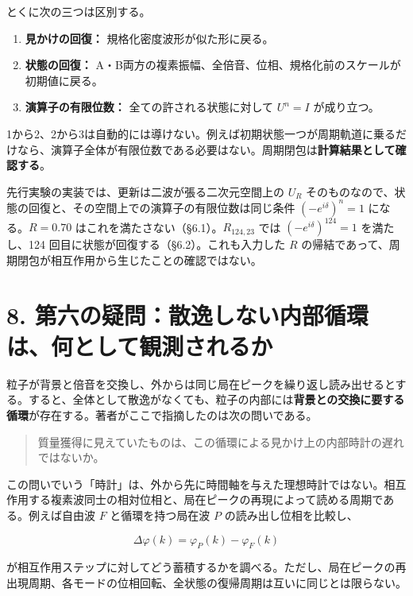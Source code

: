 \documentclass[
  a4paper,
]{ltjsarticle}
\providecommand{\tightlist}{%
  \setlength{\itemsep}{0pt}\setlength{\parskip}{0pt}}
\begin{document}
とくに次の三つは区別する。

\begin{enumerate}
\def\labelenumi{\arabic{enumi}.}
\tightlist
\item
  \textbf{見かけの回復：} 規格化密度波形が似た形に戻る。
\item
  \textbf{状態の回復：}
  A・B両方の複素振幅、全倍音、位相、規格化前のスケールが初期値に戻る。
\item
  \textbf{演算子の有限位数：} 全ての許される状態に対して \(U^n=I\)
  が成り立つ。
\end{enumerate}

1から2、2から3は自動的には導けない。例えば初期状態一つが周期軌道に乗るだけなら、演算子全体が有限位数である必要はない。周期閉包は\textbf{計算結果として確認する}。

先行実験の実装では、更新は二波が張る二次元空間上の \(U_R\)
そのものなので、状態の回復と、その空間上での演算子の有限位数は同じ条件
\((-e^{i\delta})^n=1\) になる。\(R=0.70\)
はこれを満たさない（§6.1）。\(R_{124,23}\) では
\((-e^{i\delta})^{124}=1\) を満たし、124
回目に状態が回復する（§6.2）。これも入力した \(R\)
の帰結であって、周期閉包が相互作用から生じたことの確認ではない。

\section{8.
第六の疑問：散逸しない内部循環は、何として観測されるか}\label{ux7b2cux516dux306eux7591ux554fux6563ux9038ux3057ux306aux3044ux5185ux90e8ux5faaux74b0ux306fux4f55ux3068ux3057ux3066ux89b3ux6e2cux3055ux308cux308bux304b}

粒子が背景と倍音を交換し、外からは同じ局在ピークを繰り返し読み出せるとする。すると、全体として散逸がなくても、粒子の内部には\textbf{背景との交換に要する循環}が存在する。著者がここで指摘したのは次の問いである。

\begin{quote}
質量獲得に見えていたものは、この循環による見かけ上の内部時計の遅れではないか。
\end{quote}

この問いでいう「時計」は、外から先に時間軸を与えた理想時計ではない。相互作用する複素波同士の相対位相と、局在ピークの再現によって読める周期である。例えば自由波
\(F\) と循環を持つ局在波 \(P\) の読み出し位相を比較し、

\[
\Delta\varphi(k)=\varphi_P(k)-\varphi_F(k)
\]

が相互作用ステップに対してどう蓄積するかを調べる。ただし、局在ピークの再出現周期、各モードの位相回転、全状態の復帰周期は互いに同じとは限らない。
\end{document}
